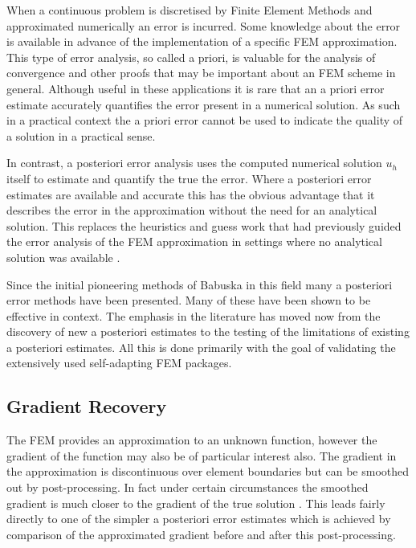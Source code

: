 \documentclass{uonmathreport}
\theoremstyle{definition}
\theoremstyle{problem}
\theoremstyle{theorem}
\begin{document}
When a continuous problem is discretised by Finite Element Methods and approximated numerically an error is incurred. Some knowledge about the error is available in advance of the implementation of a specific FEM approximation. This type of error analysis, so called a priori, is valuable for the analysis of convergence and other proofs that may be important about an FEM scheme in general. Although useful in these applications it is rare that an a priori error estimate accurately quantifies the error present in a numerical solution. As such in a practical context the a priori error cannot be used to indicate the quality of a solution in a practical sense. 

In contrast, a posteriori error analysis uses the computed numerical solution $u_h$ itself to estimate and quantify the true the error. Where a posteriori error estimates are available and accurate this has the obvious advantage that it describes the error in the approximation without the need for an analytical solution. This replaces the heuristics and guess work that had previously guided the error analysis of the FEM approximation in settings where no analytical solution was available \cite{ainsworth65001posteriori}. 

Since the initial pioneering methods of Babuska \cite{babuska1978posteriori} \cite{babuska1981posteriori} in this field many a posteriori error methods have been presented. Many of these have been shown to be effective in context. The emphasis in the literature has moved now from the discovery of new a posteriori estimates to the testing of the limitations of existing a posteriori estimates. All this is done primarily with the goal of validating the extensively used self-adapting FEM packages.

\subsection{Gradient Recovery} \label{subsubsec:KK}

The FEM provides an approximation to an unknown function, however the gradient of the function may also be of particular interest also. The gradient in the approximation is discontinuous over element boundaries but can be smoothed out by post-processing. In fact under certain circumstances the smoothed gradient is much closer to the gradient of the true solution \cite{ainsworth65001posteriori}. This leads fairly directly to one of the simpler a posteriori error estimates which is achieved by comparison of the approximated gradient before and after this post-processing.
\end{document}

